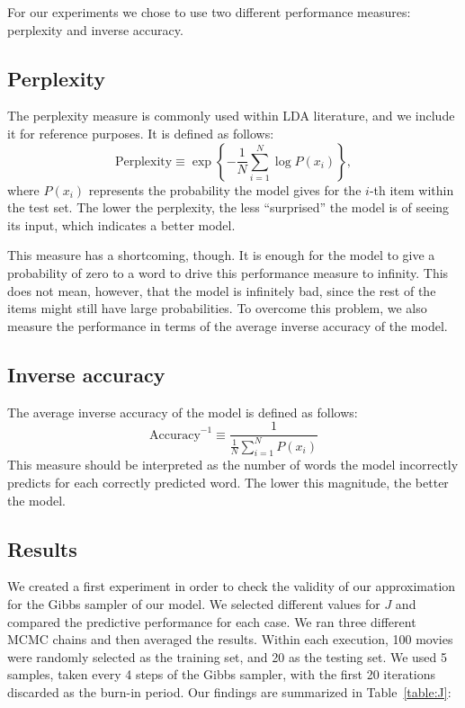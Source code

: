 \documentclass{article} %
\begin{document}
For our experiments we chose to use two different performance measures: perplexity and inverse accuracy.

\subsection{Perplexity}

The perplexity measure is commonly used within LDA literature, and we include it for reference purposes. 
It is defined as follows:
\begin{equation}
\text{Perplexity} \equiv \exp \left\{ -\frac{1}{N} \sum_{i = 1}^N \log P(x_i)  \right\},
\end{equation}
where \(P(x_i)\) represents the probability the model gives for the $i$-th item within the test set. The lower the perplexity, the less ``surprised'' the model is of seeing its input, which indicates a better model.

This measure has a shortcoming, though. 
It is enough for the model to give a probability of zero to a word to drive this performance measure to infinity. 
This does not mean, however, that the model is infinitely bad, since the rest of the items might still have large probabilities.
To overcome this problem, we also measure the performance in terms of the average inverse accuracy of the model.

\subsection{Inverse accuracy}

The average inverse accuracy of the model is defined as follows:
\begin{equation}
\text{Accuracy}^{-1} \equiv \frac{1}{\frac{1}{N}\sum_{i = 1}^N P(x_i)}
\end{equation}
This measure should be interpreted as the number of words the model incorrectly predicts for each correctly predicted word. 
The lower this magnitude, the better the model.

\subsection{Results}

We created a first experiment in order to check the validity of our approximation for the Gibbs sampler of our model. 
We selected different values for $J$ and compared the predictive performance for each case. 
We ran three different MCMC chains and then averaged the results. 
Within each execution, 100 movies were randomly selected as the training set, and 20 as the testing set. 
We used 5 samples, taken every 4 steps of the Gibbs sampler, with the first 20 iterations discarded as the burn-in period. 
Our findings are summarized in Table~\ref{table:J}:
\end{document}
